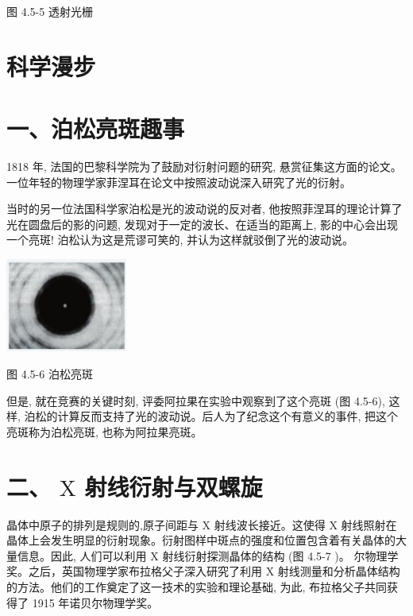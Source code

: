 \documentclass[10pt]{article}
\begin{document}
图 4.5-5 透射光栅

\section*{科学漫步}

\section*{一、泊松亮斑趣事}

1818 年, 法国的巴黎科学院为了鼓励对衍射问题的研究, 悬赏征集这方面的论文。一位年轻的物理学家菲涅耳在论文中按照波动说深入研究了光的衍射。

当时的另一位法国科学家泊松是光的波动说的反对者, 他按照菲涅耳的理论计算了光在圆盘后的影的问题, 发现对于一定的波长、在适当的距离上, 影的中心会出现一个亮斑! 泊松认为这是荒谬可笑的, 并认为这样就驳倒了光的波动说。

\begin{center}
\includegraphics[max width=0.3\textwidth]{images/01910e4c-ebb8-7d2c-8f2f-2375bc1d2d12_111_879365.jpg}
\end{center}

图 4.5-6 泊松亮斑

但是, 就在竞赛的关键时刻, 评委阿拉果在实验中观察到了这个亮斑 (图 4.5-6), 这样, 泊松的计算反而支持了光的波动说。后人为了纪念这个有意义的事件, 把这个亮斑称为泊松亮斑, 也称为阿拉果亮斑。

\section*{二、 \(\mathrm{X}\) 射线衍射与双螺旋}

晶体中原子的排列是规则的,原子间距与 \(\mathrm{X}\) 射线波长接近。这使得 \(\mathrm{X}\) 射线照射在晶体上会发生明显的衍射现象。衍射图样中斑点的强度和位置包含着有关晶体的大量信息。因此, 人们可以利用 \(\mathrm{X}\) 射线衍射探测晶体的结构 (图 4.5-7 )。 尔物理学奖。之后，英国物理学家布拉格父子深入研究了利用 \(\mathrm{X}\) 射线测量和分析晶体结构的方法。他们的工作奠定了这一技术的实验和理论基础, 为此, 布拉格父子共同获得了 1915 年诺贝尔物理学奖。
\end{document}
